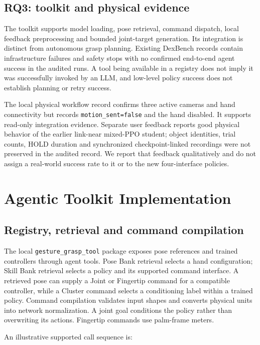 \documentclass[10pt,twocolumn]{article}
\begin{document}
\subsection{RQ3: toolkit and physical evidence}

The toolkit supports model loading, pose retrieval, command dispatch, local feedback preprocessing and bounded joint-target generation. Its integration is distinct from autonomous grasp planning. Existing DexBench records contain infrastructure failures and safety stops with no confirmed end-to-end agent success in the audited runs. A tool being available in a registry does not imply it was successfully invoked by an LLM, and low-level policy success does not establish planning or retry success.

The local physical workflow record confirms three active cameras and hand connectivity but records \texttt{motion\_sent=false} and the hand disabled. It supports read-only integration evidence. Separate user feedback reports good physical behavior of the earlier link-near mixed-PPO student; object identities, trial counts, HOLD duration and synchronized checkpoint-linked recordings were not preserved in the audited record. We report that feedback qualitatively and do not assign a real-world success rate to it or to the new four-interface policies.

\section{Agentic Toolkit Implementation}

\subsection{Registry, retrieval and command compilation}

The local \texttt{gesture\_grasp\_tool} package exposes pose references and trained controllers through agent tools. Pose Bank retrieval selects a hand configuration; Skill Bank retrieval selects a policy and its supported command interface. A retrieved pose can supply a Joint or Fingertip command for a compatible controller, while a Cluster command selects a conditioning label within a trained policy. Command compilation validates input shapes and converts physical units into network normalization. A joint goal conditions the policy rather than overwriting its actions. Fingertip commands use palm-frame meters.

An illustrative supported call sequence is:
\end{document}
